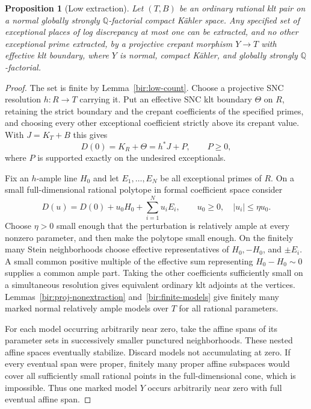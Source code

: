 \documentclass[11pt,letterpaper]{article}
\newtheorem{proposition}[theorem]{Proposition}
\theoremstyle{definition}
\theoremstyle{remark}
\begin{document}
\begin{proposition}[Low extraction]
\label{bir:low-extraction}
Let $(T,B)$ be an ordinary rational klt pair on a normal globally
strongly $\mathbb{Q}$-factorial compact K\"ahler space.  Any specified set of
exceptional places of log discrepancy at most one can be extracted,
and no other exceptional prime extracted, by a projective crepant
morphism $Y\to T$ with effective klt boundary, where $Y$ is normal,
compact K\"ahler, and globally strongly $\mathbb{Q}$-factorial.
\end{proposition}

\begin{proof}
The set is finite by Lemma~\ref{bir:low-count}.  Choose a projective
SNC resolution $h:R\to T$ carrying it.  Put an effective SNC klt
boundary $\Theta$ on $R$, retaining the strict boundary and the
crepant coefficients of the specified primes, and choosing every
other exceptional coefficient strictly above its crepant value.
With $J=K_T+B$ this gives
\begin{equation}
 D(0)=K_R+\Theta=h^*J+P,\qquad P\geq0,
 \label{bir:extraction-origin}
\end{equation}
where $P$ is supported exactly on the undesired exceptionals.

Fix an $h$-ample line $H_0$ and let $E_1,\ldots,E_N$ be all
exceptional primes of $R$.  On a small full-dimensional rational
polytope in formal coefficient space consider
\begin{equation}
 D(u)=D(0)+u_0H_0+\sum_{i=1}^{N}u_iE_i,
 \qquad u_0\geq0,\quad |u_i|\leq\eta u_0.
 \label{bir:extraction-polytope}
\end{equation}
Choose $\eta>0$ small enough that the perturbation is relatively ample
at every nonzero parameter, and then make the polytope small enough.
On the finitely many Stein neighborhoods choose effective
representatives of $H_0,-H_0$, and $\pm E_i$.  A small common positive
multiple of the effective sum representing $H_0-H_0\sim0$ supplies a
common ample part.  Taking the other coefficients sufficiently small
on a simultaneous resolution gives equivalent ordinary klt adjoints
at the vertices.  Lemmas~\ref{bir:proj-nonextraction}
and~\ref{bir:finite-models} give finitely many marked normal relatively
ample models over $T$ for all rational parameters.

For each model occurring arbitrarily near zero, take the affine spans
of its parameter sets in successively smaller punctured
neighborhoods.  These nested affine spaces eventually stabilize.
Discard models not accumulating at zero.  If every eventual span
were proper, finitely many proper affine subspaces would cover all
sufficiently small rational points in the full-dimensional cone,
which is impossible.  Thus one marked model $Y$ occurs arbitrarily
near zero with full eventual affine span.


\end{proof}
\end{document}
